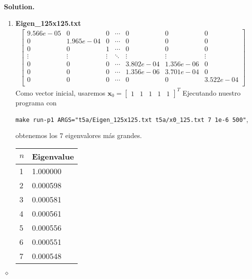 \documentclass{article}
\theoremstyle{problemstyle}
\newenvironment{solution}{%
  \begin{mdframed}[linewidth=0.8pt,linecolor=Gray,backgroundcolor=Gray!5,roundcorner=5pt]%
  \noindent\textbf{Solution.}%
}{%
\hfill $ \diamond $ 
  \end{mdframed}%
}
\begin{document}
\begin{solution}
\begin{enumerate}
        \item \textbf{Eigen\_125x125.txt}
		      \begin{align*}
			      \begin{bmatrix}
				      9.566e-05 & 0         & 0      & \cdots & 0         & 0         & 0         \\
				      0         & 1.965e-04 & 0      & \cdots & 0         & 0         & 0         \\
				      0 & 0 & 1      & \cdots & 0         & 0         & 0         \\
				      \vdots    & \vdots    & \vdots & \ddots & \vdots    & \vdots    & \vdots    \\
				      0         & 0         & 0      & \cdots & 3.802e-04 & 1.356e-06 & 0         \\
				      0         & 0         & 0      & \cdots & 1.356e-06 & 3.701e-04 & 0         \\
				      0         & 0         & 0      & \cdots & 0         & 0         & 3.522e-04 \\
			      \end{bmatrix}
		      \end{align*}
		      Como vector inicial, usaremos $ \mathbf{x}_0 = \begin{bmatrix}
				      1 & 1 & 1 & 1 & 1
			      \end{bmatrix}^{T} $
		      Ejecutando nuestro programa con
		      \begin{center}
			      \texttt{make run-p1
				      ARGS="t5a/Eigen\_125x125.txt t5a/x0\_125.txt 7 1e-6 500"},
		      \end{center}
		      obtenemos los 7 eigenvalores m\'as grandes.
		      \begin{table}[H]
			      \begin{center}
				      \begin{tabular}{|l|l|}
					      \hline
					      $ n $ & Eigenvalue \\
					      \hline
					      1     &1.000000\\
					      \hline
					      2     & 0.000598\\
					      \hline
					      3     & 0.000581\\
					      \hline
					      4     & 0.000561\\
					      \hline
					      5     & 0.000556\\
					      \hline
					      6     & 0.000551\\
					      \hline
					      7     & 0.000548\\

\end{tabular}
\end{center}
\end{table}
\end{enumerate}
\end{solution}
\end{document}
